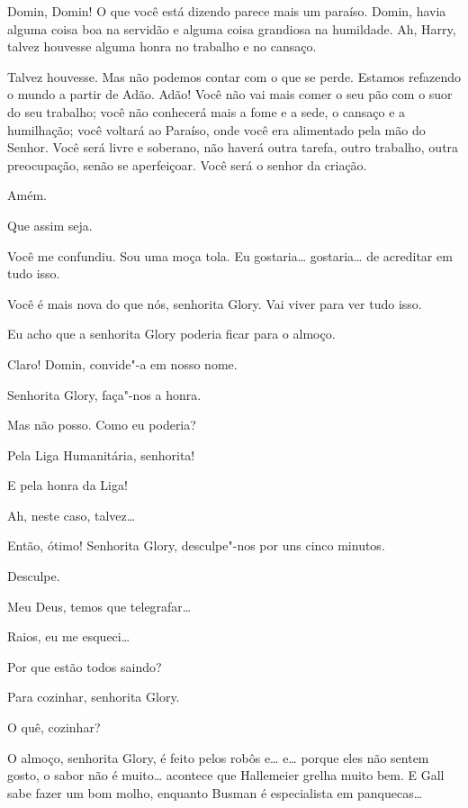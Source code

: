  Domin, Domin! O que você está dizendo parece mais um paraíso. Domin,
havia alguma coisa boa na servidão e alguma coisa grandiosa na humildade. Ah,
Harry, talvez houvesse alguma honra no trabalho e no cansaço.

 Talvez houvesse. Mas não podemos contar com o que se perde. Estamos
refazendo o mundo a partir de Adão. Adão! Você não vai mais comer o seu
pão com o suor do seu trabalho; você não conhecerá mais a fome e a sede, o
cansaço e a humilhação; você voltará ao Paraíso, onde você era alimentado pela
mão do Senhor. Você será livre e soberano, não haverá outra tarefa, outro
trabalho, outra preocupação, senão se aperfeiçoar. Você será o senhor da criação.

 Amém.

 Que assim seja.

 Você me confundiu. Sou uma moça tola. Eu gostaria\ldots{} gostaria\ldots{} de
acreditar em tudo isso.

 Você é mais nova do que nós, senhorita Glory. Vai viver para ver tudo
isso.

 Eu acho que a senhorita Glory poderia ficar para o almoço.

 Claro! Domin, convide"-a em nosso nome.

 Senhorita Glory, faça"-nos a honra.

 Mas não posso. Como eu poderia?

 Pela Liga Humanitária, senhorita!

 E pela honra da Liga!

 Ah, neste caso, talvez\ldots{}

 Então, ótimo! Senhorita Glory, desculpe"-nos por uns cinco minutos.

 Desculpe.

 Meu Deus, temos que telegrafar\ldots{}

 Raios, eu me esqueci\ldots{}

 Por que estão todos saindo?

 Para cozinhar, senhorita Glory.

 O quê, cozinhar?

 O almoço, senhorita Glory, é feito pelos robôs e\ldots{} e\ldots{} porque
eles não sentem gosto, o sabor não é muito\ldots{} acontece que Hallemeier grelha
muito bem. E Gall sabe fazer um bom molho, enquanto Busman é especialista em
panquecas\ldots{}

